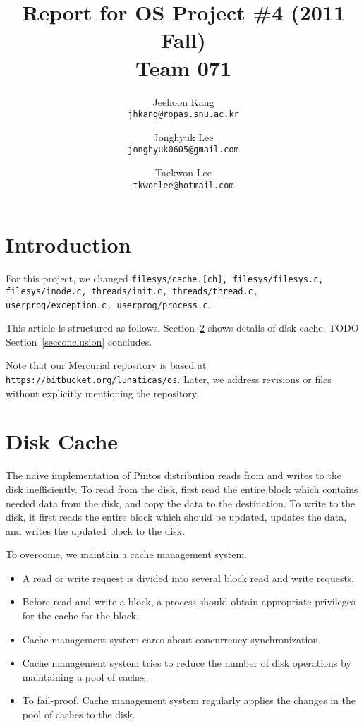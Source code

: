 \documentclass[a4paper,article,11pt,oneside]{article}
\begin{document}
\title{Report for OS Project \#4 (2011 Fall)\\Team 071}
\author{Jeehoon Kang\\\texttt{jhkang@ropas.snu.ac.kr}\and
  Jonghyuk Lee\\\texttt{jonghyuk0605@gmail.com} \and
  Taekwon Lee\\\texttt{tkwonlee@hotmail.com} }
\maketitle

\section{Introduction}
For this project, we changed \texttt{filesys/cache.[ch],
  filesys/filesys.c, filesys/inode.c, threads/init.c,
  threads/thread.c, userprog/exception.c, userprog/process.c}.

This article is structured as follows. Section~\ref{seccache} shows
details of disk cache. TODO Section~\ref{secconclusion} concludes.

Note that our Mercurial repository is based at
\texttt{https://bitbucket.org/lunaticas/os}. Later, we address
revisions or files without explicitly mentioning the repository.

\section{Disk Cache}\label{seccache}
The naive implementation of Pintos distribution reads from and writes
to the disk inefficiently. To read from the disk, first read the
entire block which contains needed data from the disk, and copy the
data to the destination. To write to the disk, it first reads the entire
block which should be updated, updates the data, and writes the
updated block to the disk.

To overcome, we maintain a cache management system.
\begin{itemize}
\item A read or write request is divided into several block read and
  write requests.
\item Before read and write a block, a process should obtain
  appropriate privileges for the cache for the block.
\item Cache management system cares about concurrency synchronization.
\item Cache management system tries to reduce the number of disk
  operations by maintaining a pool of caches.
\item To fail-proof, Cache management system regularly applies the
  changes in the pool of caches to the disk.
\end{itemize}
\end{document}
